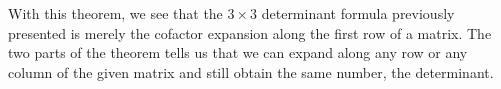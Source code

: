 \documentclass{ximera}
\begin{document}





With this theorem, we see that the $3 \times 3$ determinant formula
previously presented is merely the cofactor expansion along the first
row of a matrix. The two parts of the theorem tells us that we can
expand along any row or any column of the given matrix and still
obtain the same number, the determinant.
\end{document}

